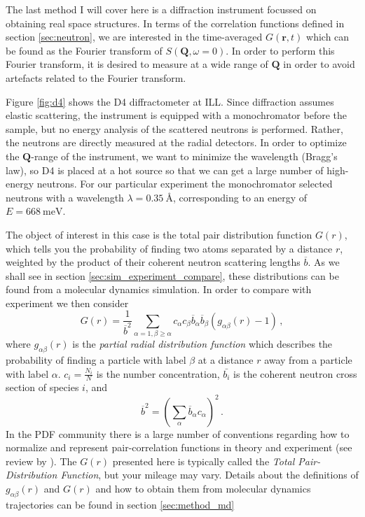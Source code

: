 The last method I will cover here is a diffraction instrument focussed on obtaining real space structures. In terms of the correlation functions defined in section \ref{sec:neutron}, we are interested in the time-averaged $G(\bm{r}, t)$ which can be found as the Fourier transform of $S(\bm{Q},\omega=0)$. In order to perform this Fourier transform, it is desired to measure at a wide range of $\bm{Q}$ in order to avoid artefacts related to the Fourier transform.

Figure \ref{fig:d4} shows the D4 diffractometer at ILL. Since diffraction assumes elastic scattering, the instrument is equipped with a monochromator before the sample, but no energy analysis of the scattered neutrons is performed. Rather, the neutrons are directly measured at the radial detectors. In order to optimize the $\bm{Q}$-range of the instrument, we want to minimize the wavelength (Bragg's law), so D4 is placed at a hot source so that we can get a large number of high-energy neutrons. For our particular experiment the monochromator selected neutrons with a wavelength $\lambda = \SI{0.35}{\angstrom}$, corresponding to an energy of $E = \SI{668}{\milli\eV}$.

The object of interest in this case is the total pair distribution function $G(r)$, which tells you the probability of finding two atoms separated by a distance $r$, weighted by the product of their coherent neutron scattering lengths $\overline{b}$. As we shall see in section \ref{sec:sim_experiment_compare}, these distributions can be found from a molecular dynamics simulation. In order to compare with experiment  we then consider
%
\[ G(r) = \frac{1}{\overline{b}^2} \sum_{\alpha=1,\beta\geq\alpha} c_\alpha c_\beta \overline{b}_\alpha \overline{b}_\beta (g_{\alpha\beta}(r) - 1) \, , \]
%
where $g_{\alpha\beta}(r)$ is the \emph{partial radial distribution function} which describes the probability of finding a particle with label $\beta$ at a distance $r$ away from a particle with label $\alpha$. $c_i = \frac{N_i}{N}$ is the number concentration, $\bar{b_i}$ is the coherent neutron cross section of species $i$,  and 
%
\[ \overline{b}^2 = \left(\sum_\alpha \overline{b}_\alpha c_\alpha \right)^2 \, . \]
In the PDF community there is a large number of conventions regarding how to normalize and represent pair-correlation functions in theory and experiment (see review by \citeauthor{Keen2001} \cite{Keen2001}). The $G(r)$ presented here is typically called the \emph{Total Pair-Distribution Function}, but your mileage may vary. Details about the definitions of $g_{\alpha\beta}(r)$ and $G(r)$ and how to obtain them from molecular dynamics trajectories can be found in section \ref{sec:method_md}

